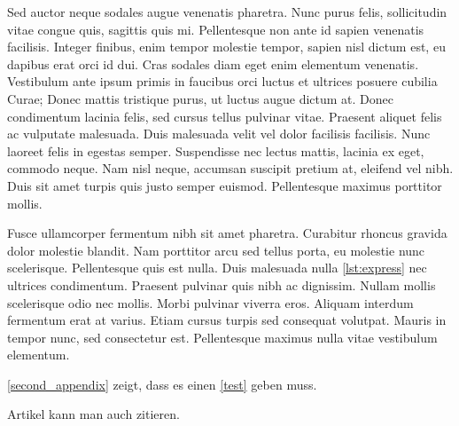 \documentclass[%
    auto-generate   = true,             %
    debug           = true,             %
    print-ndn       = true,             %
    print-loa       = true,             %
    print-lof       = true,             %
    print-lot       = true,             %
    print-lol       = true,             %
    bib-file        = literature.bib,   %
    plantuml        = true,             %
    title-style     = default,          %
    font-size       = 12pt              %
]{udhbwvst}
\begin{document}
Sed auctor neque sodales augue venenatis pharetra. Nunc purus felis, sollicitudin vitae congue quis, sagittis quis mi. Pellentesque non ante id sapien venenatis facilisis. Integer finibus, enim tempor molestie tempor, sapien nisl dictum est, eu dapibus erat orci id dui. Cras sodales diam eget enim elementum venenatis. Vestibulum ante ipsum primis in faucibus orci luctus et ultrices posuere cubilia Curae; Donec mattis tristique purus, ut luctus augue dictum at. Donec condimentum lacinia felis, sed cursus tellus pulvinar vitae. Praesent aliquet felis ac vulputate malesuada. Duis malesuada velit vel dolor facilisis facilisis. Nunc laoreet felis in egestas semper. Suspendisse nec lectus mattis, lacinia ex eget, commodo neque. Nam nisl neque, accumsan suscipit pretium at, eleifend vel nibh. Duis sit amet turpis quis justo semper euismod. Pellentesque maximus porttitor mollis.


Fusce ullamcorper fermentum nibh sit amet pharetra. Curabitur rhoncus gravida dolor molestie blandit. Nam porttitor arcu sed tellus porta, eu molestie nunc scelerisque. Pellentesque quis est nulla. Duis malesuada nulla \autoref{lst:express} nec ultrices condimentum. Praesent pulvinar quis nibh ac dignissim. Nullam mollis scelerisque odio nec mollis. Morbi pulvinar viverra eros. Aliquam interdum fermentum erat at varius. Etiam cursus turpis sed consequat volutpat. Mauris in tempor nunc, sed consectetur est. Pellentesque maximus nulla vitae vestibulum elementum. 

\blinddocument

\autoref{second_appendix} zeigt, dass es einen \autoref{test} geben muss.

Artikel kann man auch zitieren.

\begin{dhbwappendices}

    \lipsum

    \lipsum

\end{dhbwappendices}
\end{document}
